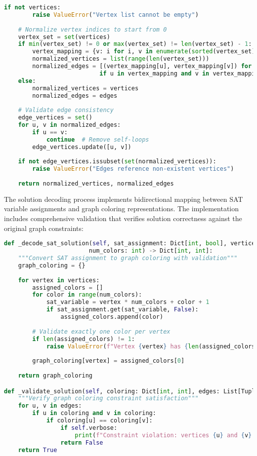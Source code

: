 \begin{lstlisting}[language=Python, caption=Flexible Graph Input Processing]
    if not vertices:
        raise ValueError("Vertex list cannot be empty")
    
    # Normalize vertex indices to start from 0
    vertex_set = set(vertices)
    if min(vertex_set) != 0 or max(vertex_set) != len(vertex_set) - 1:
        vertex_mapping = {v: i for i, v in enumerate(sorted(vertex_set))}
        normalized_vertices = list(range(len(vertex_set)))
        normalized_edges = [(vertex_mapping[u], vertex_mapping[v]) for u, v in edges 
                           if u in vertex_mapping and v in vertex_mapping]
    else:
        normalized_vertices = vertices
        normalized_edges = edges
    
    # Validate edge consistency
    edge_vertices = set()
    for u, v in normalized_edges:
        if u == v:
            continue  # Remove self-loops
        edge_vertices.update([u, v])
    
    if not edge_vertices.issubset(set(normalized_vertices)):
        raise ValueError("Edges reference non-existent vertices")
    
    return normalized_vertices, normalized_edges
\end{lstlisting}

The solution decoding process implements bidirectional mapping between SAT variable assignments and graph coloring representations. The implementation includes comprehensive validation that verifies solution correctness against the original graph constraints:

\begin{lstlisting}[language=Python, caption=Solution Decoding and Validation]
def _decode_sat_solution(self, sat_assignment: Dict[int, bool], vertices: List[int], 
                        num_colors: int) -> Dict[int, int]:
    """Convert SAT assignment to graph coloring with validation"""
    graph_coloring = {}
    
    for vertex in vertices:
        assigned_colors = []
        for color in range(num_colors):
            sat_variable = vertex * num_colors + color + 1
            if sat_assignment.get(sat_variable, False):
                assigned_colors.append(color)
        
        # Validate exactly one color per vertex
        if len(assigned_colors) != 1:
            raise ValueError(f"Vertex {vertex} has {len(assigned_colors)} colors assigned")
        
        graph_coloring[vertex] = assigned_colors[0]
    
    return graph_coloring

def _validate_solution(self, coloring: Dict[int, int], edges: List[Tuple[int, int]]) -> bool:
    """Verify graph coloring constraint satisfaction"""
    for u, v in edges:
        if u in coloring and v in coloring:
            if coloring[u] == coloring[v]:
                if self.verbose:
                    print(f"Constraint violation: vertices {u} and {v} have same color {coloring[u]}")
                return False
    return True
\end{lstlisting}

